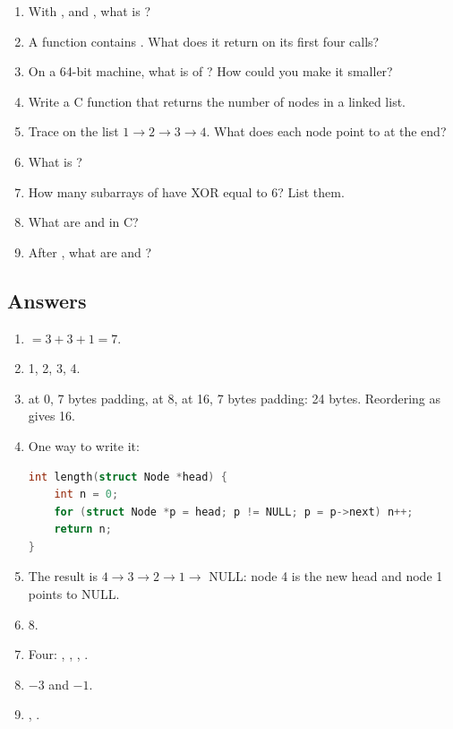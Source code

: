 \begin{enumerate}
  \item With ,  and , what is ?
  \item A function contains . What does it return on its first four calls?
  \item On a 64-bit machine, what is  of ? How could you make it smaller?
  \item Write a C function that returns the number of nodes in a linked list.
  \item Trace  on the list $1 \to 2 \to 3 \to 4$. What does each node point to at the end?
  \item What is ?
  \item How many subarrays of \code{[4, 2, 2, 6, 4]} have XOR equal to 6? List them.
  \item What are  and  in C?
  \item After , what are  and ?
\end{enumerate}

\subsection*{Answers}
\begin{enumerate}
  \item {} $= 3 + 3 + 1 = 7$.
  \item 1, 2, 3, 4.
  \item {} at 0, 7 bytes padding,  at 8,  at 16, 7 bytes padding: 24 bytes. Reordering as  gives 16.
  \item One way to write it:
\begin{lstlisting}[language=C]
int length(struct Node *head) {
    int n = 0;
    for (struct Node *p = head; p != NULL; p = p->next) n++;
    return n;
}
\end{lstlisting}
  \item The result is $4 \to 3 \to 2 \to 1 \to$ NULL: node 4 is the new head and node 1 points to NULL.
  \item 8.
  \item Four: \code{[4, 2]}, \code{[4, 2, 2, 6, 4]}, \code{[2, 2, 6]}, \code{[6]}.
  \item $-3$ and $-1$.
  \item {}, .
\end{enumerate}
